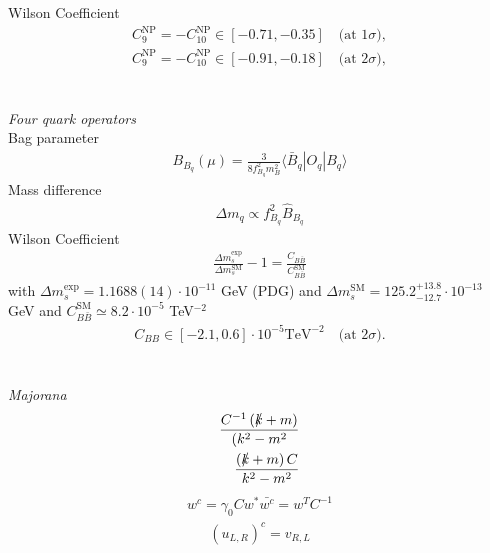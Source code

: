 Wilson Coefficient \cite{150306199}
\begin{align}
 C_9^\text{NP} = -C_{10}^\text{NP} \in [-0.71,-0.35]\quad \text{(at 1}\sigma),\\
 C_9^\text{NP} = -C_{10}^\text{NP} \in [-0.91,-0.18]\quad \text{(at 2}\sigma),
\end{align}
\\ \\ \textit{Four quark operators}\\
Bag parameter \cite{1607.00299}
\begin{align}
 B_{B_q}(\mu) = \frac{3}{8f_{B_q}^2 m_B^2} \langle \bar B_q |O_q|B_q \rangle
\end{align}
Mass difference \cite{1102.0009}
\begin{align}
 \Delta m_q \propto f^2_{B_q} \hat{B}_{B_q}
\end{align}
Wilson Coefficient
\begin{align}
 \frac{\Delta m_s^\text{exp}}{\Delta m_s^\text{SM}}-1 = \frac{C_{B\bar B}}{C^\text{SM}_{B\bar B}}
\end{align}
with $\Delta m_s^\text{exp} = 1.1688(14) \cdot 10^{-11}$ GeV (PDG) \cite{1602.03560} and $\Delta m_s^\text{SM} = 125.2^{+13.8}_{-12.7} \cdot 10^{-13}$ GeV \cite{1102.0009}
and $C_{B\bar B}^\text{SM} \simeq 8.2\cdot 10^{-5}$ TeV$^{-2}$ 
\begin{align}
 C_{BB} \in [-2.1,0.6] \cdot 10^{-5} \text{TeV}^{-2}\quad \text{(at 2}\sigma).
\end{align}
\\ \\ \textit{Majorana}\\
\begin{equation}
\begin{aligned}
 \frac{C^{-1}\left(\slashed{k}+m\right)}{(k^2-m^2}\\
 \frac{\left(\slashed{k}+m\right)C}{k^2-m^2}
\end{aligned}
\label{eq_majoProp}
\end{equation}
\begin{equation}
\begin{aligned}
 w^c = \gamma_0 C w^*
 \bar {w^c}= w^T C^{-1}
\end{aligned}
\label{eq_ChargeConj}
\end{equation}
\cite{Fierz}
\begin{align}
 \left(u_{L,R}\right)^c = v_{R,L}
\end{align}



